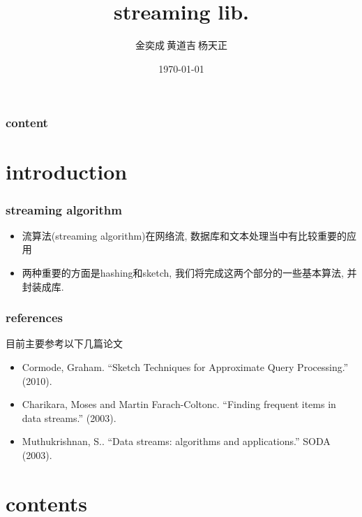 \documentclass[cjk]{beamer}
\begin{document}
\begin{CJK*}{UTF8}{gbsn}
\title{streaming lib.}
\author{金奕成$\ $黄道吉$\ $杨天正}
\date{\today}

\begin{frame}
  \titlepage
\end{frame}

\begin{frame}
  \frametitle{content}
  \tableofcontents
\end{frame}

\section{introduction}
  \begin{frame}
    \frametitle{streaming algorithm}
    \begin{itemize}
      \item 流算法(streaming algorithm)在网络流, 数据库和文本处理当中有比较重要的应用
      \item 两种重要的方面是hashing和sketch, 我们将完成这两个部分的一些基本算法, 并封装成库.
    \end{itemize}
  \end{frame}

  \begin{frame}
    \frametitle{references}
    目前主要参考以下几篇论文
    \begin{itemize}
      \item Cormode, Graham. “Sketch Techniques for Approximate Query Processing.” (2010).
      \item Charikara, Moses and Martin Farach-Coltonc. “Finding frequent items in data streams.” (2003).
      \item Muthukrishnan, S.. “Data streams: algorithms and applications.” SODA (2003).
    \end{itemize}
  \end{frame}

\section{contents}

\end{CJK*}
\end{document}
